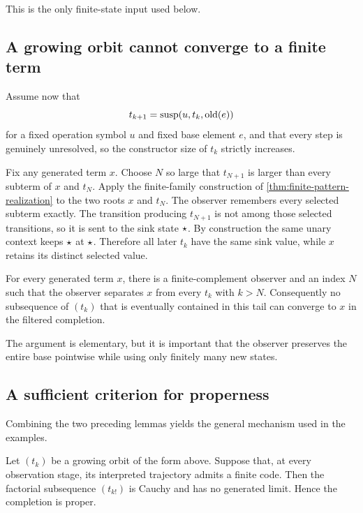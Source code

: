 This is the only finite-state input used below.

\subsection{A growing orbit cannot converge to a finite term}

Assume now that
\[
  t_{k+1}=\operatorname{susp}(u,t_k,\operatorname{old}(e))
\]
for a fixed operation symbol $u$ and fixed base element $e$, and that every
step is genuinely unresolved, so the constructor size of $t_k$ strictly
increases.

Fix any generated term $x$.  Choose $N$ so large that $t_{N+1}$ is larger than
every subterm of $x$ and $t_N$.  Apply the finite-family construction of
\cref{thm:finite-pattern-realization} to the two roots $x$ and $t_N$.  The
observer remembers every selected subterm exactly.  The transition producing
$t_{N+1}$ is not among those selected transitions, so it is sent to the sink
state $\star$.  By construction the same unary context keeps
$\star$ at $\star$.  Therefore all later $t_k$ have the same sink
value, while $x$ retains its distinct selected value.

\begin{lemma}
\label{lem:no-generated-limit}
For every generated term $x$, there is a finite-complement observer and an
index $N$ such that the observer separates $x$ from every $t_k$ with $k>N$.
Consequently no subsequence of $(t_k)$ that is eventually contained in this
tail can converge to $x$ in the filtered completion.
\end{lemma}

The argument is elementary, but it is important that the observer preserves the
entire base pointwise while using only finitely many new states.

\subsection{A sufficient criterion for properness}

Combining the two preceding lemmas yields the general mechanism used in the
examples.

\begin{theorem}
\label{thm:compression-escape-properness}
Let $(t_k)$ be a growing orbit of the form above.  Suppose that, at every
observation stage, its interpreted trajectory admits a finite code.  Then the
factorial subsequence $(t_{k!})$ is Cauchy and has no generated limit.  Hence
the completion is proper.
\end{theorem}

